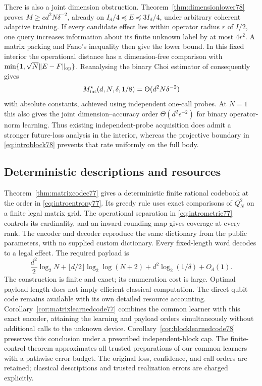 There is also a joint dimension obstruction.
Theorem~\ref{thm:dimensionlower78} proves
$M\ge c d^2N\delta^{-2}$, already on
$I_d/4\preceq E\preceq3I_d/4$, under arbitrary coherent adaptive
training.  If every candidate effect lies within operator radius $r$
of $I/2$, one query increases information about its finite unknown
label by at most $4r^2$.  A matrix packing and Fano's inequality
then give the lower bound.
In this fixed interior the operational distance has a dimension-free
comparison with $\min\{1,\sqrt N\|E-F\|_{\rm op}\}$.
Reanalysing the binary Choi estimator of \cite{MB67} consequently gives
\begin{equation}\label{eq:introinterior78}
 M_{\rm int}^\star(d,N,\delta,1/8)
 =\Theta(d^2N\delta^{-2})
\end{equation}
with absolute constants, achieved using independent one-call probes.
At $N=1$ this also gives the joint dimension--accuracy order
$\Theta(d^2\epsilon^{-2})$ for binary operator-norm learning.
Thus existing independent-probe acquisition does admit a stronger
future-loss analysis in the interior, whereas the projective boundary
in \eqref{eq:introblock78} prevents that rate uniformly on the full body.

\subsection{Deterministic descriptions and resources}
Theorem~\ref{thm:matrixcodec77} gives a deterministic finite rational
codebook at the order in \eqref{eq:introentropy77}. Its greedy rule
uses exact comparisons of $Q_N^2$ on a finite legal matrix grid.
The operational separation in \eqref{eq:intrometric77} controls its
cardinality, and an inward rounding map gives coverage at every rank.
The encoder and decoder reproduce the same dictionary from the public
parameters, with no supplied custom dictionary. Every fixed-length
word decodes to a legal effect. The required payload is
\[
 \frac{d^2}{2}\log_2N+
 \lfloor d/2\rfloor\log_2\log(N+2)
             +d^2\log_2(1/\delta)+O_d(1).
\]
The construction is finite and exact; its enumeration cost is large.
Optimal payload length does not imply efficient classical computation.
The direct qubit code remains available with its own detailed resource
accounting. Corollary~\ref{cor:matrixlearnedcode77} combines the common
learner with this exact encoder, attaining the learning and payload
orders simultaneously without additional calls to the unknown device.
Corollary~\ref{cor:blocklearnedcode78} preserves this conclusion under
a prescribed independent-block cap.  The finite-control theorem
approximates all trusted preparations of our common learners with a
pathwise error budget.  The original loss, confidence, and call orders
are retained; classical descriptions and trusted realization errors
are charged explicitly.

